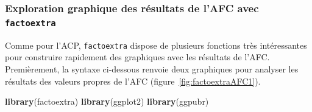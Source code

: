 \documentclass[
  11pt,
  french,
]{book}
\makeatletter
\newenvironment{Shaded}{\begin{snugshade}}{\end{snugshade}}
\newcommand{\KeywordTok}[1]{\textcolor[rgb]{0.13,0.29,0.53}{\textbf{#1}}}
\newcommand{\NormalTok}[1]{#1}
\newenvironment{kframe}{%
\medskip{}
\setlength{\fboxsep}{.8em}
 \def\at@end@of@kframe{}%
 \ifinner\ifhmode%
  \def\at@end@of@kframe{\end{minipage}}%
  \begin{minipage}{\columnwidth}%
 \fi\fi%
 \def\FrameCommand##1{\hskip\@totalleftmargin \hskip-\fboxsep
 \colorbox{shadecolor}{##1}\hskip-\fboxsep
     \hskip-\linewidth \hskip-\@totalleftmargin \hskip\columnwidth}%
 \MakeFramed {\advance\hsize-\width
   \@totalleftmargin\z@ \linewidth\hsize
   \@setminipage}}%
 {\par\unskip\endMakeFramed%
 \at@end@of@kframe}
\renewenvironment{Shaded}{\begin{kframe}}{\end{kframe}}
\makeatother
\begin{document}
\hypertarget{sect12332}{%
\subsubsection{\texorpdfstring{Exploration graphique des résultats de l'AFC avec \texttt{factoextra}}{Exploration graphique des résultats de l'AFC avec factoextra}}\label{sect12332}}

Comme pour l'ACP, \texttt{factoextra} dispose de plusieurs fonctions très intéressantes pour construire rapidement des graphiques avec les résultats de l'AFC. Premièrement, la syntaxe ci-dessous renvoie deux graphiques pour analyser les résultats des valeurs propres de l'AFC (figure~\ref{fig:factoextraAFC1}).

\begin{Shaded}
\begin{Highlighting}[]
\KeywordTok{library}\NormalTok{(factoextra)}
\KeywordTok{library}\NormalTok{(ggplot2)}
\KeywordTok{library}\NormalTok{(ggpubr)}


\end{Highlighting}
\end{Shaded}
\end{document}
